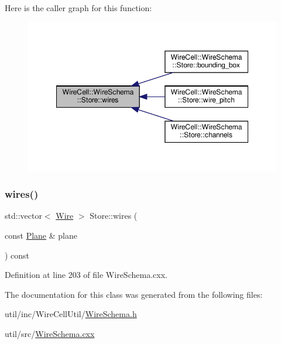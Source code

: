 Here is the caller graph for this function\+:
\nopagebreak
\begin{figure}[H]
\begin{center}
\leavevmode
\includegraphics[width=348pt]{class_wire_cell_1_1_wire_schema_1_1_store_acdd83e45f8004e2ad4ac625d7fce47d3_icgraph}
\end{center}
\end{figure}
\mbox{\label{class_wire_cell_1_1_wire_schema_1_1_store_a56cd36c90641895a9e3c22406c363061}} 
\subsubsection{\texorpdfstring{wires()}{wires()}\hspace{0.1cm}{\footnotesize\ttfamily [2/2]}}
{\footnotesize\ttfamily std\+::vector$<$ \hyperlink{struct_wire_cell_1_1_wire_schema_1_1_wire}{Wire} $>$ Store\+::wires (\begin{DoxyParamCaption}\item[{const \hyperlink{struct_wire_cell_1_1_wire_schema_1_1_plane}{Plane} \&}]{plane }\end{DoxyParamCaption}) const}



Definition at line 203 of file Wire\+Schema.\+cxx.



The documentation for this class was generated from the following files\+:\begin{DoxyCompactItemize}
\item 
util/inc/\+Wire\+Cell\+Util/\hyperlink{_wire_schema_8h}{Wire\+Schema.\+h}\item 
util/src/\hyperlink{_wire_schema_8cxx}{Wire\+Schema.\+cxx}\end{DoxyCompactItemize}
